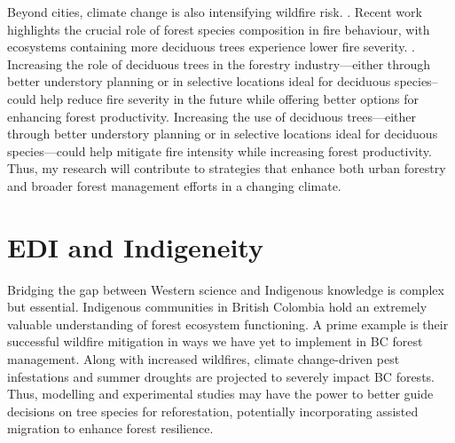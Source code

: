 \documentclass[11pt,letter]{article}
\begin{document}
Beyond cities, climate change is also intensifying wildfire risk. \citep{wasserman_climate_2023}. 
Recent work highlights the crucial role of forest species composition in fire behaviour, with ecosystems containing more deciduous trees experience lower fire severity. \citep{park_impact_2024}. 
Increasing the role of deciduous trees in the forestry industry---either through better understory planning or in selective locations ideal for deciduous species--could help reduce fire severity in the future while offering better options for enhancing forest productivity.\citep{mack_carbon_2021} Increasing the use of deciduous trees—either through better understory planning or in selective locations ideal for deciduous species—could help mitigate fire intensity while increasing forest productivity. Thus, my research will contribute to strategies that enhance both urban forestry and broader forest management efforts in a changing climate.
\section *{EDI and Indigeneity}
Bridging the gap between Western science and Indigenous knowledge is complex but essential. Indigenous communities in British Colombia hold an extremely valuable understanding of forest ecosystem functioning. A prime example is their successful wildfire mitigation in ways we have yet to implement in BC forest management. Along with increased wildfires, climate change-driven pest infestations and summer droughts are projected to severely impact BC forests. \citep{williams_climate_2002} Thus, modelling and experimental studies may have the power to better guide decisions on tree species for reforestation, potentially incorporating assisted migration to enhance forest resilience. \citep{aitken_time_2016}
\end{document}
